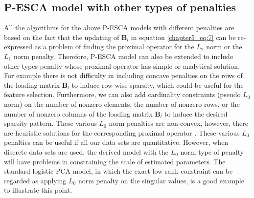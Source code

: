 \subsection{P-ESCA model with other types of penalties}
All the algorithms for the above P-ESCA models with different penalties are based on the fact that the updating of $\mathbf{B}_l$ in equation \ref{chapter5_eq:7} can be re-expressed as a problem of finding the proximal operator for the $L_2$ norm or the $L_1$ norm penalty. Therefore, P-ESCA model can also be extended to include other types penalty whose proximal operator has simple or analytical solution. For example there is not difficulty in including concave penalties on the rows of the loading matrix $\mathbf{B}_l$ to induce row-wise sparsity, which could be useful for the feature selection. Furthermore, we can also add cardinality constraints (pseudo $L_{0}$ norm) on the number of nonzero elements, the number of nonzero rows, or the number of nonzero columns of the loading matrix $\mathbf{B}_l$ to induce the desired sparsity pattern. These various $L_0$ norm penalties are non-convex, however, there are heuristic solutions for the corresponding proximal operator \cite{boyd2011distributed}. These various $L_0$ penalties can be useful if all our data sets are quantitative. However, when discrete data sets are used, the derived model with the $L_0$ norm type of penalty will have problems in constraining the scale of estimated parameters. The standard logistic PCA model, in which the exact low rank constraint can be regarded as applying $L_0$ norm penalty on the singular values, is a good example to illustrate this point.

